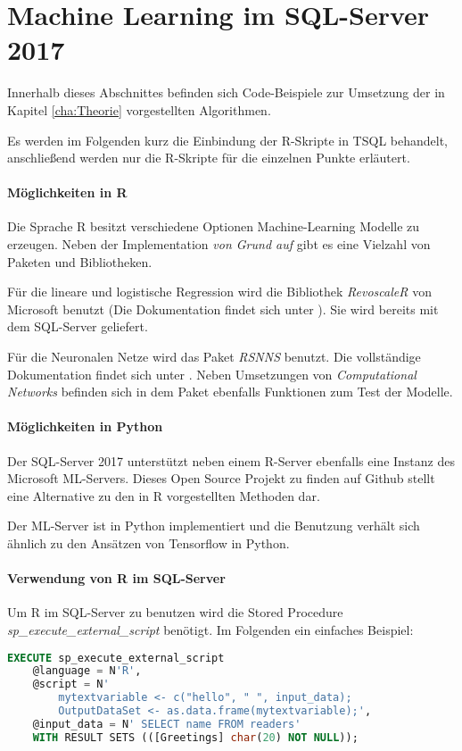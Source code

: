 \section{Machine Learning im SQL-Server 2017}
\label{sec:MLSQL} \label{sec:MachineLearning}
Innerhalb dieses Abschnittes befinden sich Code-Beispiele zur Umsetzung der in Kapitel \ref{cha:Theorie} vorgestellten Algorithmen. 

Es werden im Folgenden kurz die Einbindung der R-Skripte in TSQL behandelt, anschließend werden nur die R-Skripte für die einzelnen Punkte erläutert.
\paragraph{Möglichkeiten in  R}
Die Sprache R besitzt verschiedene Optionen Machine-Learning Modelle zu erzeugen. Neben der Implementation \textit{von Grund auf} gibt es eine Vielzahl von Paketen und Bibliotheken. 

Für die lineare und logistische Regression wird die Bibliothek \textit{RevoscaleR} von Microsoft benutzt (Die Dokumentation findet sich unter \cite{RevoscaleR}). Sie wird bereits mit dem SQL-Server geliefert. 

Für die Neuronalen Netze wird das Paket \textit{RSNNS} benutzt. Die vollständige Dokumentation findet sich unter \cite{RSNNSDoku}. Neben Umsetzungen von \textit{Computational Networks} befinden sich in dem Paket ebenfalls Funktionen zum Test der Modelle.
\paragraph{Möglichkeiten in Python}
Der SQL-Server 2017 unterstützt neben einem R-Server ebenfalls eine Instanz des Microsoft ML-Servers. Dieses Open Source Projekt zu finden auf Github \cite{GithubMLServer} stellt eine Alternative zu den in R vorgestellten Methoden dar. 

Der ML-Server ist in Python implementiert und die Benutzung verhält sich ähnlich zu den Ansätzen von Tensorflow in Python. 

\paragraph{Verwendung von R im SQL-Server}
Um R im SQL-Server zu benutzen wird die Stored Procedure \textit{sp\_execute\_external\_script} benötigt. Im Folgenden ein einfaches Beispiel: ~\newline

\begin{lstlisting}[language=SQL]
	EXECUTE sp_execute_external_script
	@language = N'R',
	@script = N' 
		mytextvariable <- c("hello", " ", input_data);
		OutputDataSet <- as.data.frame(mytextvariable);',
	@input_data = N' SELECT name FROM readers'
	WITH RESULT SETS (([Greetings] char(20) NOT NULL));
\end{lstlisting}

